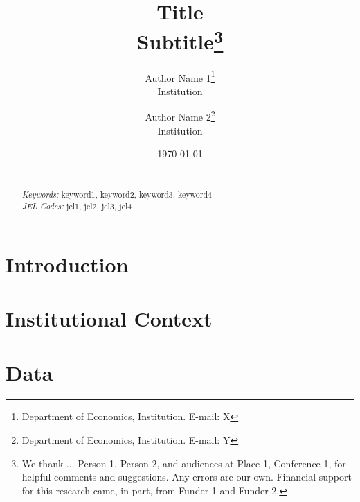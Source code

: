 \documentclass[12pt, a4paper, hidelinks]{article}
\begin{document}
\begin{titlepage}
\title{\Large \textbf{Title}\\ \large \textbf{Subtitle}\thanks{We thank ... Person 1, Person 2, and audiences at Place 1, Conference 1, for helpful comments and suggestions. Any errors are our own. Financial support for this research came, in part, from Funder 1 and Funder 2.}}
\author{Author Name 1\thanks{Department of Economics, Institution. E-mail: X} \\ \large Institution \and Author Name 2\thanks{Department of Economics, Institution. E-mail: Y} \\ \large Institution}
\date{\today}

\maketitle

\begin{abstract}
\noindent  \\ %


\noindent\textit{Keywords:} keyword1, keyword2, keyword3, keyword4 \\
\noindent\textit{JEL Codes:} jel1, jel2, jel3, jel4 \\
\end{abstract}
\setcounter{page}{0}
\thispagestyle{empty}
\end{titlepage}
\pagebreak \newpage

\section{Introduction} \label{sec:introduction}

\setlength{\parskip}{0.5em} %


\section{Institutional Context} \label{sec:institutional}

\section{Data} \label{sec:data}

\end{document}
